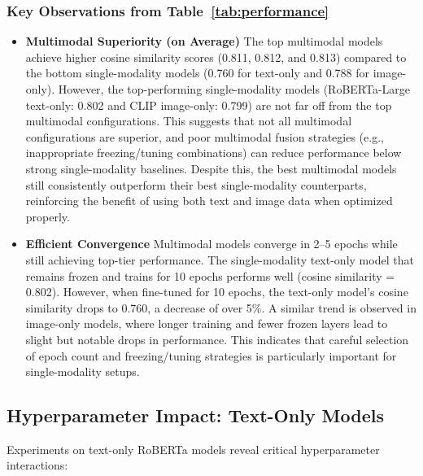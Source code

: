 \subsubsection*{Key Observations from Table~\ref{tab:performance}}


\begin{itemize}
    \item \textbf{Multimodal Superiority (on Average)}
    The top multimodal models achieve higher cosine similarity scores (0.811, 0.812, and 0.813) compared to the bottom single-modality models (0.760 for text-only and 0.788 for image-only). However, the top-performing single-modality models (RoBERTa-Large text-only: 0.802 and CLIP image-only: 0.799) are not far off from the top multimodal configurations. This suggests that not all multimodal configurations are superior, and poor multimodal fusion strategies (e.g., inappropriate freezing/tuning combinations) can reduce performance below strong single-modality baselines. Despite this, the best multimodal models still consistently outperform their best single-modality counterparts, reinforcing the benefit of using both text and image data when optimized properly.

    \item \textbf{Efficient Convergence}
    Multimodal models converge in 2–5 epochs while still achieving top-tier performance. The single-modality text-only model that remains frozen and trains for 10 epochs performs well (cosine similarity = 0.802). However, when fine-tuned for 10 epochs, the text-only model's cosine similarity drops to 0.760, a decrease of over 5\%. A similar trend is observed in image-only models, where longer training and fewer frozen layers lead to slight but notable drops in performance. This indicates that careful selection of epoch count and freezing/tuning strategies is particularly important for single-modality setups.
\end{itemize}




\subsection{Hyperparameter Impact: Text-Only Models}
\label{subsec:text-hparams}

Experiments on text-only RoBERTa models reveal critical hyperparameter interactions:
\newline

